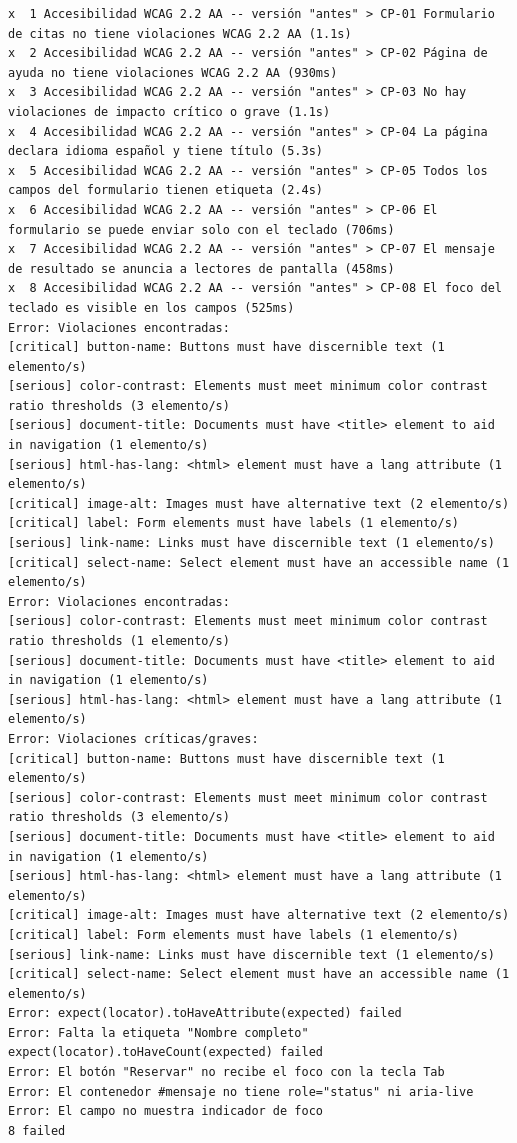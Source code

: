 \documentclass[10pt,letterpaper,onecolumn]{IEEEtran}
\begin{document}
\begin{lstlisting}
x  1 Accesibilidad WCAG 2.2 AA -- versión "antes" > CP-01 Formulario de citas no tiene violaciones WCAG 2.2 AA (1.1s)
x  2 Accesibilidad WCAG 2.2 AA -- versión "antes" > CP-02 Página de ayuda no tiene violaciones WCAG 2.2 AA (930ms)
x  3 Accesibilidad WCAG 2.2 AA -- versión "antes" > CP-03 No hay violaciones de impacto crítico o grave (1.1s)
x  4 Accesibilidad WCAG 2.2 AA -- versión "antes" > CP-04 La página declara idioma español y tiene título (5.3s)
x  5 Accesibilidad WCAG 2.2 AA -- versión "antes" > CP-05 Todos los campos del formulario tienen etiqueta (2.4s)
x  6 Accesibilidad WCAG 2.2 AA -- versión "antes" > CP-06 El formulario se puede enviar solo con el teclado (706ms)
x  7 Accesibilidad WCAG 2.2 AA -- versión "antes" > CP-07 El mensaje de resultado se anuncia a lectores de pantalla (458ms)
x  8 Accesibilidad WCAG 2.2 AA -- versión "antes" > CP-08 El foco del teclado es visible en los campos (525ms)
Error: Violaciones encontradas:
[critical] button-name: Buttons must have discernible text (1 elemento/s)
[serious] color-contrast: Elements must meet minimum color contrast ratio thresholds (3 elemento/s)
[serious] document-title: Documents must have <title> element to aid in navigation (1 elemento/s)
[serious] html-has-lang: <html> element must have a lang attribute (1 elemento/s)
[critical] image-alt: Images must have alternative text (2 elemento/s)
[critical] label: Form elements must have labels (1 elemento/s)
[serious] link-name: Links must have discernible text (1 elemento/s)
[critical] select-name: Select element must have an accessible name (1 elemento/s)
Error: Violaciones encontradas:
[serious] color-contrast: Elements must meet minimum color contrast ratio thresholds (1 elemento/s)
[serious] document-title: Documents must have <title> element to aid in navigation (1 elemento/s)
[serious] html-has-lang: <html> element must have a lang attribute (1 elemento/s)
Error: Violaciones críticas/graves:
[critical] button-name: Buttons must have discernible text (1 elemento/s)
[serious] color-contrast: Elements must meet minimum color contrast ratio thresholds (3 elemento/s)
[serious] document-title: Documents must have <title> element to aid in navigation (1 elemento/s)
[serious] html-has-lang: <html> element must have a lang attribute (1 elemento/s)
[critical] image-alt: Images must have alternative text (2 elemento/s)
[critical] label: Form elements must have labels (1 elemento/s)
[serious] link-name: Links must have discernible text (1 elemento/s)
[critical] select-name: Select element must have an accessible name (1 elemento/s)
Error: expect(locator).toHaveAttribute(expected) failed
Error: Falta la etiqueta "Nombre completo"
expect(locator).toHaveCount(expected) failed
Error: El botón "Reservar" no recibe el foco con la tecla Tab
Error: El contenedor #mensaje no tiene role="status" ni aria-live
Error: El campo no muestra indicador de foco
8 failed
\end{lstlisting}
\end{document}
